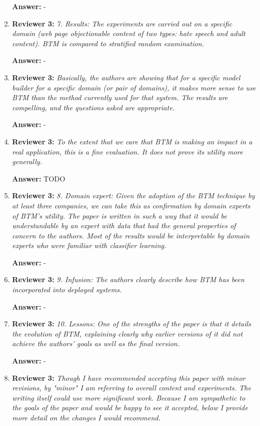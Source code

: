 \documentclass[letterpaper]{article}
\begin{document}
\begin{enumerate}
\textbf{Answer:} -

\item \textbf{Reviewer 3:} \emph{ 7. Results:  The experiments are carried out on a specific domain (web page objectionable content of two types: hate speech and adult content). BTM is compared to stratified random examination.}

\textbf{Answer:} -

\item \textbf{Reviewer 3:} \emph{ Basically, the authors are showing that for a specific model builder for a specific domain (or pair of domains), it makes more sense to use BTM than the method currently used for that system.  The results are compelling, and the questions asked are appropriate.}

\textbf{Answer:} -

\item \textbf{Reviewer 3:} \emph{ To the extent that we care that BTM is making an impact in a real application, this is a fine evaluation.  It does not prove its utility more generally.}

\textbf{Answer:} TODO

\item \textbf{Reviewer 3:} \emph{ 8. Domain expert: Given the adoption of the BTM technique by at least three companies, we can take this as confirmation by domain experts of BTM's utility. The paper is written in such a way that it would be understandable by an expert with data that had the general properties of concern to the authors. Most of the results would be interpretable by domain experts who were familiar with classifier learning.}

\textbf{Answer:} -

\item \textbf{Reviewer 3:} \emph{ 9. Infusion: The authors clearly describe how BTM has been incorporated into deployed systems.}

\textbf{Answer:} -

\item \textbf{Reviewer 3:} \emph{ 10. Lessons: One of the strengths of the paper is that it details the evolution of BTM, explaining clearly why earlier versions of it did not achieve the authors' goals as well as the final version.}

\textbf{Answer:} -

\item \textbf{Reviewer 3:} \emph{ Though I have recommended accepting this paper with minor revisions, by "minor" I am referring to overall content and experiments.  The writing itself could use more significant work.  Because I am sympathetic to the goals of the paper and would be happy to see it accepted, below I provide more detail on the changes I would recommend.}


\end{enumerate}
\end{document}
